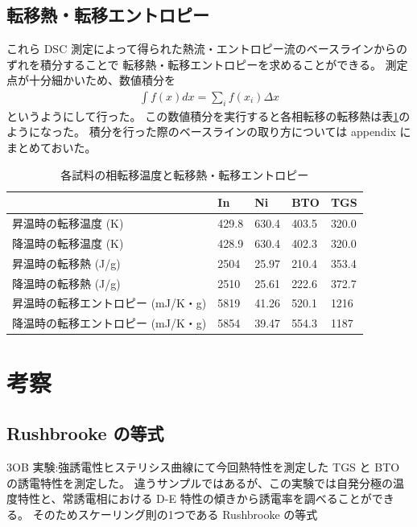 \documentclass[9pt,dvipdfmx,a4paper]{jsarticle}
\begin{document}
\subsection{転移熱・転移エントロピー}
これら DSC 測定によって得られた熱流・エントロピー流のベースラインからのずれを積分することで
転移熱・転移エントロピーを求めることができる。
測定点が十分細かいため、数値積分を
\begin{align}
    \int f(x)dx = \sum_{i} f(x_i)\Delta x
\end{align}
というようにして行った。
この数値積分を実行すると各相転移の転移熱は表\ref{table:integral}のようになった。
積分を行った際のベースラインの取り方については appendix にまとめておいた。
\begin{table}[hbt]
    \centering
    \caption{各試料の相転移温度と転移熱・転移エントロピー}
    \label{table:integral}
    \begin{tabular}{lllll}
    \hline
                             & In    & Ni    & BTO   & TGS   \\
    \hline
    昇温時の転移温度 (K)       & 429.8 & 630.4 & 403.5 & 320.0 \\
    降温時の転移温度 (K)       & 428.9 & 630.4 & 402.3 & 320.0 \\
    昇温時の転移熱   (J/g)     & 2504  & 25.97 & 210.4 & 353.4 \\
    降温時の転移熱   (J/g)     & 2510  & 25.61 & 222.6 & 372.7 \\
    昇温時の転移エントロピー (mJ/K・g)   & 5819  & 41.26 & 520.1 & 1216  \\
    降温時の転移エントロピー (mJ/K・g)   & 5854  & 39.47 & 554.3 & 1187 \\
    \hline
    \end{tabular}
\end{table}

\clearpage
\section{考察}
\subsection{Rushbrooke の等式}
3OB 実験:強誘電性ヒステリシス曲線にて今回熱特性を測定した TGS と BTO の誘電特性を測定した。
違うサンプルではあるが、この実験では自発分極の温度特性と、常誘電相における D-E 特性の傾きから誘電率を調べることができる。
そのためスケーリング則の1つである Rushbrooke の等式
\end{document}
